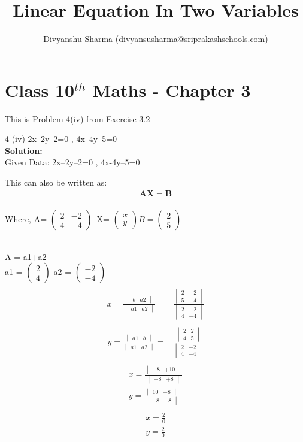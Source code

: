 \documentclass[12pt]{article}
\title{Linear Equation In Two Variables}
\author{Divyanshu Sharma (divyansusharma@sriprakashschools.com)}
\newcommand{\myvec}[1]{\ensuremath{\begin{pmatrix}#1\end{pmatrix}}}
\newcommand{\mydet}[1]{\ensuremath{\begin{vmatrix}#1\end{vmatrix}}}
\newcommand{\solution}{\noindent \textbf{Solution: }}
\let\vec\mathbf
\begin{document}
\maketitle
\section*{Class 10$^{th}$ Maths - Chapter 3}
This is Problem-4(iv) from Exercise 3.2
\item 4 (iv) 2x–2y–2=0 , 4x–4y–5=0 \\

\solution \\
Given Data: 2x–2y–2=0 , 4x-4y–5=0

This can also be written as:
\begin{align}
\vec{A}\vec{X}=\vec{B}
\end{align}
 \\ Where, A= $\myvec{2&-2\\4&-4}$\ X= $\myvec{x\\y} B= $\myvec{2\\5}

    \\A = a1+a2
    \\a1 = \myvec{2\\4} a2 = \myvec{-2\\-4}
\begin{align}
\\x = \frac{\mydet{ b & a2}}{\mydet{ a1 & a2}} =&
\frac{\mydet{ 2 & -2 \\ 5 & -4}}{\mydet{2&-2\\4&-4}}
\end{align}
\begin{align}
\\y = \frac{\mydet{ a1 & b}}{\mydet{ a1 & a2}} =&
\frac{\mydet{ 2 & 2 \\ 4 & 5}}{\mydet{2&-2\\4&-4}}
\end{align}
\begin{align}
  \\x = \frac{\mydet{ -8 & +10}}{\mydet{ -8& +8}} 
  \\y =   \frac{\mydet{ 10 & -8}}{\mydet{ -8 & +8}} 
\end{align}
\begin{align}
\\ x = \frac{2}{0}
\\ y = \frac{2}{0}
\end{align}
\end{document}
